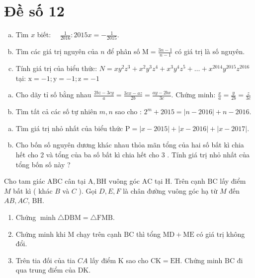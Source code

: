 \onehalfspacing
\section{Đề số 12}

\begin{bt} 
    \hfill
	\begin{enumerate}[a.]
		\item Tìm $x$ biết: $\quad \frac{1}{2016}: 2015 x=-\frac{1}{2015}$.
        \item Tìm các giá trị nguyên của $n$ để phân số $\mathrm{M}=\frac{3 n-1}{n-1}$ có giá trị là số nguyên.
        \item Tính giá trị của biểu thức: $N=x y^2 z^3+x^2 y^3 z^4+x^3 y^4 z^5+\ldots+x^{2014} y^{2015} z^{2016}$ tại: $\mathrm{x}=-1 ; \mathrm{y}=-1 ; \mathrm{z}=-1$
	\end{enumerate}
	\loigiai{} 
\end{bt}

\begin{bt}
	\hfill
	\begin{enumerate}[a.]
		\item Cho dãy tỉ số bằng nhau $\frac{2 b z-3 c y}{a}=\frac{3 c x-a z}{2 b}=\frac{a y-2 b x}{3 c}$. Chứng minh: $\frac{x}{a}=\frac{y}{2 b}=\frac{z}{3 c}$
        \item Tìm tất cả các số tự nhiên $m, n$ sao cho : $2^m+2015=|n-2016|+n-2016$.
	\end{enumerate}
	\loigiai{} 
\end{bt}

\begin{bt}
	\hfill
	\begin{enumerate}[a.]
		\item Tìm giá trị nhỏ nhất của biểu thức $\mathrm{P}=|x-2015|+|x-2016|+|x-2017|$.
        \item Cho bốn số nguyên dương khác nhau thỏa mãn tổng của hai số bất kì chia hết cho 2 và tổng của ba số bất kì chia hết cho 3 . Tính giá trị nhỏ nhất của tổng bốn số này ?
	\end{enumerate}
	\loigiai{}
\end{bt}

\begin{bt}
    Cho tam giác $\mathrm{ABC}$ cân tại $\mathrm{A}, \mathrm{BH}$ vuông góc $\mathrm{AC}$ tại $\mathrm{H}$. Trên cạnh $\mathrm{BC}$ lấy điểm $M$ bất kì ( khác $B$ và $C$ ). Gọi $D, E, F$ là chân đường vuông góc hạ từ $M$ đến $A B, A C$, $\mathrm{BH}$.
    \begin{enumerate}
        \item Chứng $\operatorname{minh} \triangle \mathrm{DBM}=\triangle \mathrm{FMB}$.
        \item Chứng minh khi $\mathrm{M}$ chạy trên cạnh $\mathrm{BC}$ thì tổng $\mathrm{MD}+\mathrm{ME}$ có giá trị không đổi.
        \item Trên tia đối của tia $C A$ lấy điểm $\mathrm{K}$ sao cho $\mathrm{CK}=\mathrm{EH}$. Chứng minh $\mathrm{BC}$ đi qua trung điểm của DK.
    \end{enumerate}
\loigiai{}
\end{bt}


